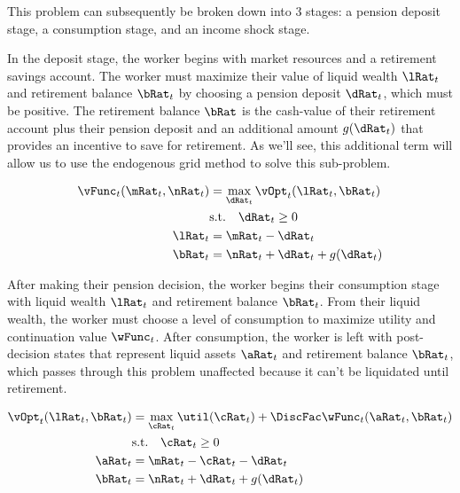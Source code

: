 \documentclass[\econtexRoot/SequentialEGM]{subfiles}
\begin{document}
This problem can subsequently be broken down into 3 stages: a pension deposit stage, a consumption stage, and an income shock stage.

In the deposit stage, the worker begins with market resources and a retirement savings account. The worker must maximize their value of liquid wealth $\lRat_{t}$ and retirement balance $\bRat_{t}$ by choosing a pension deposit $\dRat_{t}$, which must be positive. The retirement balance $\bRat$ is the cash-value of their retirement account plus their pension deposit and an additional amount $g(\dRat_{t})$ that provides an incentive to save for retirement. As we'll see, this additional term will allow us to use the endogenous grid method to solve this sub-problem.

\begin{equation}
        \begin{split}
                \vFunc_{t}(\mRat_{t}, \nRat_{t}) & = \max_{\dRat_{t}} \vOpt_{t}(\lRat_{t}, \bRat_{t}) \\
                & \text{s.t.}  \quad \dRat_{t} \ge 0 \\
                \lRat_{t} & = \mRat_{t} - \dRat_{t} \\
                \bRat_{t} & = \nRat_{t} + \dRat_{t} + g(\dRat_{t})
        \end{split}
\end{equation}

After making their pension decision, the worker begins their consumption stage with liquid wealth $\lRat_{t}$ and retirement balance $\bRat_{t}$. From their liquid wealth, the worker must choose a level of consumption to maximize utility and continuation value $\wFunc_{t}$. After consumption, the worker is left with post-decision states that represent liquid assets $\aRat_{t}$ and retirement balance $\bRat_{t}$, which passes through this problem unaffected because it can't be liquidated until retirement.

\begin{equation}
        \begin{split}
                \vOpt_{t}(\lRat_{t}, \bRat_{t}) & = \max_{\cRat_{t}} \util(\cRat_{t}) + \DiscFac \wFunc_{t}(\aRat_{t}, \bRat_{t})  \\
                & \text{s.t.} \quad \cRat_{t} \ge 0 \\
                \aRat_{t} & = \mRat_{t} - \cRat_{t} - \dRat_{t} \\
                \bRat_{t} & = \nRat_{t} + \dRat_{t} + g(\dRat_{t})
        \end{split}
\end{equation}
\end{document}
